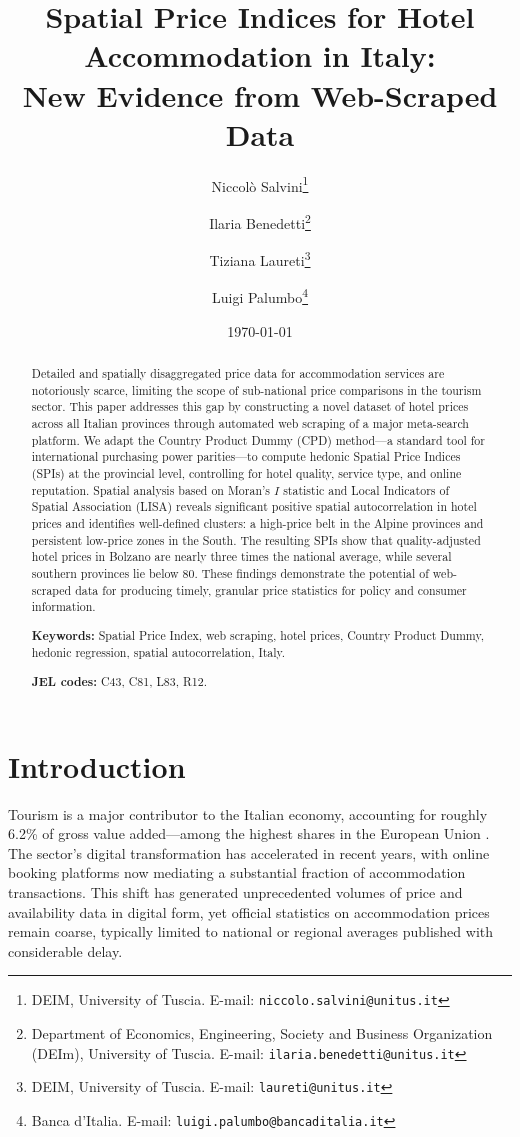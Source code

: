\documentclass[12pt,a4paper]{article}
\title{\textbf{Spatial Price Indices for Hotel Accommodation in Italy:\\New Evidence from Web-Scraped Data}}
\author{
    Niccolò Salvini\thanks{DEIM, University of Tuscia. E-mail: \texttt{niccolo.salvini@unitus.it}} \and
    Ilaria Benedetti\thanks{Department of Economics, Engineering, Society and Business Organization (DEIm), University of Tuscia. E-mail: \texttt{ilaria.benedetti@unitus.it}} \and
    Tiziana Laureti\thanks{DEIM, University of Tuscia. E-mail: \texttt{laureti@unitus.it}} \and
    Luigi Palumbo\thanks{Banca d'Italia. E-mail: \texttt{luigi.palumbo@bancaditalia.it}}
}
\date{\today}
\begin{document}
\maketitle

\begin{abstract}
Detailed and spatially disaggregated price data for accommodation services are notoriously scarce, limiting the scope of sub-national price comparisons in the tourism sector. This paper addresses this gap by constructing a novel dataset of hotel prices across all Italian provinces through automated web scraping of a major meta-search platform. We adapt the Country Product Dummy (CPD) method---a standard tool for international purchasing power parities---to compute hedonic Spatial Price Indices (SPIs) at the provincial level, controlling for hotel quality, service type, and online reputation. Spatial analysis based on Moran's $I$ statistic and Local Indicators of Spatial Association (LISA) reveals significant positive spatial autocorrelation in hotel prices and identifies well-defined clusters: a high-price belt in the Alpine provinces and persistent low-price zones in the South. The resulting SPIs show that quality-adjusted hotel prices in Bolzano are nearly three times the national average, while several southern provinces lie below 80. These findings demonstrate the potential of web-scraped data for producing timely, granular price statistics for policy and consumer information.

\medskip
\noindent \textbf{Keywords:} Spatial Price Index, web scraping, hotel prices, Country Product Dummy, hedonic regression, spatial autocorrelation, Italy.

\medskip
\noindent \textbf{JEL codes:} C43, C81, L83, R12.
\end{abstract}

\section{Introduction}
\label{sec:introduction}

Tourism is a major contributor to the Italian economy, accounting for roughly 6.2\% of gross value added---among the highest shares in the European Union \citep{eurostat2023tsa}. The sector's digital transformation has accelerated in recent years, with online booking platforms now mediating a substantial fraction of accommodation transactions. This shift has generated unprecedented volumes of price and availability data in digital form, yet official statistics on accommodation prices remain coarse, typically limited to national or regional averages published with considerable delay.
\end{document}
